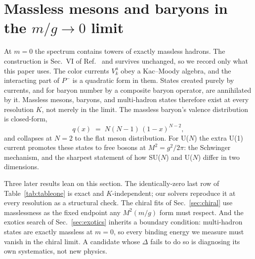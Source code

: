 \section{Massless mesons and baryons in the $m/g \to 0$ limit}
\label{sec:massless}

At $m = 0$ the spectrum contains towers of exactly massless hadrons.  The
construction is Sec.~VI of Ref.~\cite{Hornbostel:1988fb} and survives
unchanged, so we record only what this paper uses.  The color currents
$V^a_k$ obey a Kac--Moody algebra, and the interacting part of $P^-$ is a
quadratic form in them.  States created purely by currents, and for baryon
number by a composite baryon operator, are annihilated by it.  Massless
mesons, baryons, and multi-hadron states therefore exist at every
resolution $K$, not merely in the limit.  The massless baryon's valence
distribution is closed-form,
\begin{equation}
  q(x) \;=\; N(N-1)\,(1-x)^{N-2},
  \label{eq:massless-sf}
\end{equation}
and collapses at $N = 2$ to the flat meson distribution.  For U($N$) the
extra U(1) current promotes these states to free bosons at
$M^2 = g^2/2\pi$: the Schwinger mechanism, and the sharpest statement of
how SU($N$) and U($N$) differ in two dimensions.

Three later results lean on this section.  The identically-zero last row of
Table~\ref{tab:tableone} is exact and $K$-independent; our solvers
reproduce it at every resolution as a structural check.  The chiral fits of
Sec.~\ref{sec:chiral} use masslessness as the fixed endpoint any
$M^2(m/g)$ form must respect.  And the exotics search of
Sec.~\ref{sec:exotics} inherits a boundary condition: multi-hadron states
are exactly massless at $m = 0$, so every binding energy we measure must
vanish in the chiral limit.  A candidate whose $\Delta$ fails to do so is
diagnosing its own systematics, not new physics.
